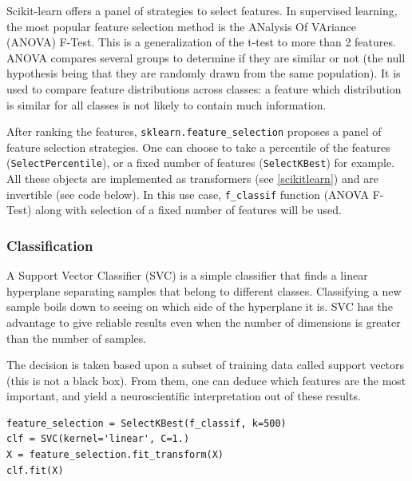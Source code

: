 \documentclass{frontiersSCNS} %
\newcounter{x}
\newcounter{y}
\newcounter{z}
\begin{document}
Scikit-learn offers a panel of strategies to select features. In supervised
learning, the most popular feature selection method is the
ANalysis Of VAriance (ANOVA) F-Test. This is a generalization of the t-test to
more than 2 features.
ANOVA compares several groups to determine if they are similar or not (the null
hypothesis being that they are randomly drawn from the same population).
It is used to compare feature distributions across classes: a feature which
distribution is similar for all classes is not likely to contain much
information.

After ranking the features, \verb!sklearn.feature_selection! proposes a panel
of feature selection strategies. One can choose to take a percentile of the features
(\verb!SelectPercentile!), or a fixed number of features (\verb!SelectKBest!)
for example. All these objects are implemented as transformers (see
\ref{scikitlearn}) and are invertible (see code below).
In this use case, \verb!f_classif! function (ANOVA F-Test) along with selection
of a fixed number of features will be used.

\subsubsection{Classification}

A Support Vector Classifier (SVC) is a simple classifier that finds a linear
hyperplane separating samples that belong to different classes. 
Classifying a new sample boils down to
seeing on which side of the hyperplane it is. SVC has the advantage to
give reliable results even when the number of dimensions is greater than the
number of samples.

The decision is taken based upon a subset of training data called
support vectors (this is not a black box). From them, one can deduce which
features are the most important, and yield a neuroscientific interpretation out
of these results.

\begin{lstlisting}
feature_selection = SelectKBest(f_classif, k=500)
clf = SVC(kernel='linear', C=1.)
X = feature_selection.fit_transform(X)
clf.fit(X)
\end{lstlisting}


\end{document}
